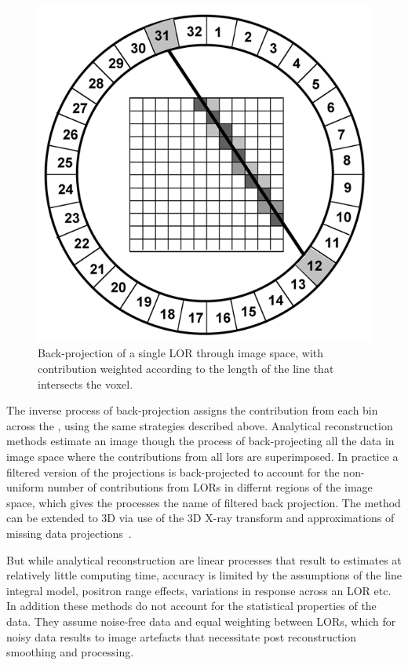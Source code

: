 \begin{figure} [h!]
\centering
\includegraphics[scale=0.35,angle=0]{2_Theory_Methods/figures/Radon_Discrete.png}
\caption{Back-projection of a single LOR through image space, with contribution weighted according to the length of the line that intersects the voxel.} 
\label{fig_3:back_projection.}
\end{figure} 

The inverse process of back-projection assigns the contribution from each bin across the , using the same strategies described above. 
Analytical reconstruction methods estimate an image though the process of back-projecting all the data in image space where the contributions from all \glspl{lor} are superimposed. In practice a filtered version of the projections is back-projected to account for the non-uniform number of contributions from LORs in differnt regions of the image space, which gives the processes the name of filtered back projection. The method can be extended to 3D via use of the 3D X-ray transform and approximations of missing data projections~\cite{Kinahan1989}. 

But while analytical reconstruction are linear processes that result to estimates at relatively little computing time, accuracy is limited by the assumptions of the line integral model, positron range effects, variations in response across an LOR etc. In addition these methods do not account for the statistical properties of the data. They assume noise-free data and equal weighting between LORs, which for noisy data results to image artefacts that necessitate post reconstruction smoothing and processing.

